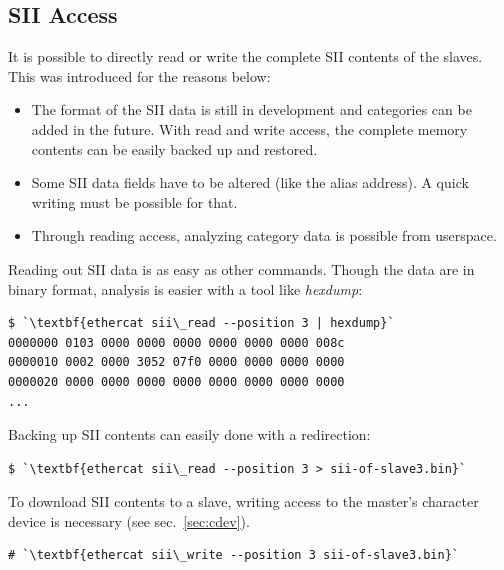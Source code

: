 \documentclass[a4paper,12pt,BCOR6mm,bibtotoc,idxtotoc]{scrbook}
\begin{document}
\subsection{SII Access}
\label{sec:siiaccess}

It is possible to directly read or write the complete SII contents of the
slaves. This was introduced for the reasons below:

\begin{itemize}

\item The format of the SII data is still in development and categories can be
added in the future. With read and write access, the complete memory contents
can be easily backed up and restored.

\item Some SII data fields have to be altered (like the alias address). A quick
writing must be possible for that.

\item Through reading access, analyzing category data is possible from
userspace.

\end{itemize}



Reading out SII data is as easy as other commands. Though the data are in
binary format, analysis is easier with a tool like \textit{hexdump}:

\begin{lstlisting}
$ `\textbf{ethercat sii\_read --position 3 | hexdump}`
0000000 0103 0000 0000 0000 0000 0000 0000 008c
0000010 0002 0000 3052 07f0 0000 0000 0000 0000
0000020 0000 0000 0000 0000 0000 0000 0000 0000
...
\end{lstlisting}

Backing up SII contents can easily done with a redirection:

\begin{lstlisting}
$ `\textbf{ethercat sii\_read --position 3 > sii-of-slave3.bin}`
\end{lstlisting}

To download SII contents to a slave, writing access to the master's character
device is necessary (see sec.~\ref{sec:cdev}).



\begin{lstlisting}
# `\textbf{ethercat sii\_write --position 3 sii-of-slave3.bin}`
\end{lstlisting}
\end{document}
